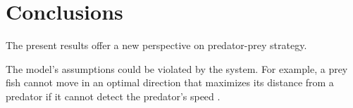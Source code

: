 \documentclass[12pt]{article}
\begin{document}
\section{Conclusions}

The present results offer a new perspective on predator-prey strategy. 


The model's assumptions could be violated by the system. For example, a prey fish cannot move in an optimal direction that maximizes its distance from a predator if it cannot detect the predator's speed \citep{Weihs:1984tb}.

\pagebreak



\end{document}

